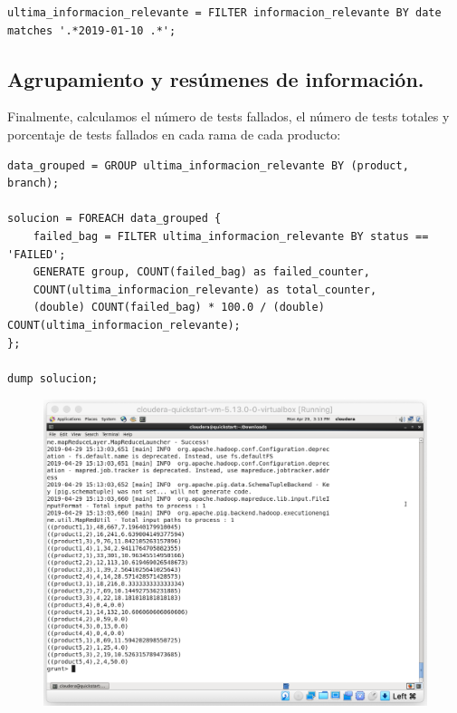 \documentclass[10pt]{article}
\begin{document}
\begin{lstlisting}[frame=single, xleftmargin=.25in, basicstyle=\small, upquote=true, breaklines = true]
ultima_informacion_relevante = FILTER informacion_relevante BY date matches '.*2019-01-10 .*';
\end{lstlisting}

\subsection{Agrupamiento y resúmenes de información.}

Finalmente, calculamos el número de tests fallados, el número de tests totales y porcentaje de tests fallados en cada rama de cada producto:

\begin{lstlisting}[frame=single, xleftmargin=.25in, basicstyle=\small, upquote=true, breaklines = true]
data_grouped = GROUP ultima_informacion_relevante BY (product, branch);

solucion = FOREACH data_grouped {
	failed_bag = FILTER ultima_informacion_relevante BY status == 'FAILED';
	GENERATE group, COUNT(failed_bag) as failed_counter, 
	COUNT(ultima_informacion_relevante) as total_counter, 
	(double) COUNT(failed_bag) * 100.0 / (double) COUNT(ultima_informacion_relevante);
};

dump solucion;
\end{lstlisting}

\begin{figure}[H]
	\centering
	\includegraphics[width=0.7\linewidth]{images/sol.png}
\end{figure}
\end{document}
